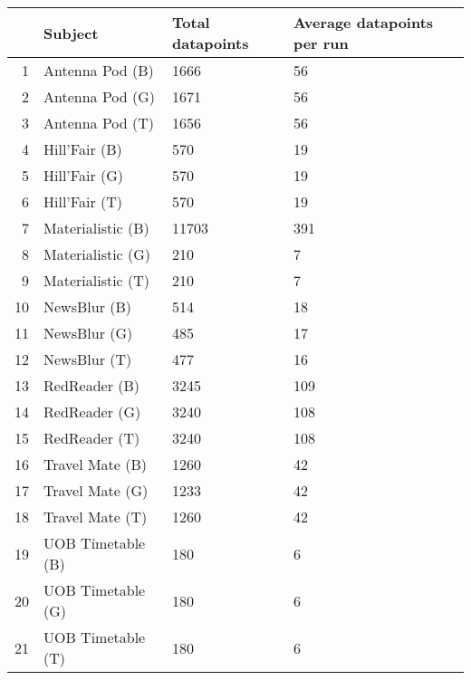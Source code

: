 \begin{table}[ht]
\centering
\begin{tabular}{rlll}
  \hline
 & Subject & Total datapoints & Average datapoints per run \\ 
  \hline
1 & Antenna Pod (B) & 1666 & 56 \\ 
  2 & Antenna Pod (G) & 1671 & 56 \\ 
  3 & Antenna Pod (T) & 1656 & 56 \\ 
  4 & Hill'Fair (B) & 570 & 19 \\ 
  5 & Hill'Fair (G) & 570 & 19 \\ 
  6 & Hill'Fair (T) & 570 & 19 \\ 
  7 & Materialistic (B) & 11703 & 391 \\ 
  8 & Materialistic (G) & 210 & 7 \\ 
  9 & Materialistic (T) & 210 & 7 \\ 
  10 & NewsBlur (B) & 514 & 18 \\ 
  11 & NewsBlur (G) & 485 & 17 \\ 
  12 & NewsBlur (T) & 477 & 16 \\ 
  13 & RedReader (B) & 3245 & 109 \\ 
  14 & RedReader (G) & 3240 & 108 \\ 
  15 & RedReader (T) & 3240 & 108 \\ 
  16 & Travel Mate (B) & 1260 & 42 \\ 
  17 & Travel Mate (G) & 1233 & 42 \\ 
  18 & Travel Mate (T) & 1260 & 42 \\ 
  19 & UOB Timetable (B) & 180 & 6 \\ 
  20 & UOB Timetable (G) & 180 & 6 \\ 
  21 & UOB Timetable (T) & 180 & 6 \\ 
   \hline
\end{tabular}
\end{table}
